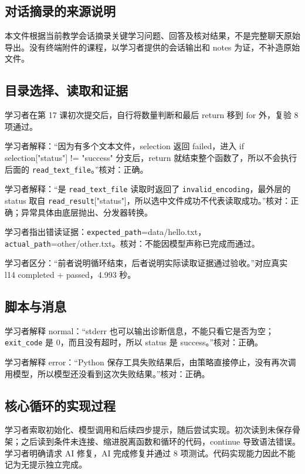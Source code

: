 \documentclass[UTF8,zihao=-4,fontset=fandol]{ctexart}
\begin{document}
\subsection{对话摘录的来源说明}

本文件根据当前教学会话摘录关键学习问题、回答及核对结果，不是完整聊天原始导出。没有终端附件的课程，以学习者提供的会话输出和 notes 为证，不补造原始文件。

\subsection{目录选择、读取和证据}

学习者在第 17 课初次提交后，自行将数量判断和最后 return 移到 for 外，复验 8 项通过。

学习者解释：“因为有多个文本文件，selection 返回 failed，进入 if selection["status"] != "success" 分支后，return 就结束整个函数了，所以不会执行后面的 \nolinkurl{read_text_file}。”核对：正确。

学习者解释：“是 \nolinkurl{read_text_file} 读取时返回了 \nolinkurl{invalid_encoding}，最外层的 status 取自 \nolinkurl{read_result}["status"]，所以选中文件成功不代表读取成功。”核对：正确；异常具体由底层抛出、分发器转换。

学习者指出错读证据：\nolinkurl{expected_path}=data/hello.txt，\nolinkurl{actual_path}=other/other.txt。核对：不能因模型声称已完成而通过。

学习者区分：“前者说明循环结束，后者说明实际读取证据通过验收。”对应真实 l14 completed + passed，4.993 秒。

\subsection{脚本与消息}

学习者解释 normal：“stderr 也可以输出诊断信息，不能只看它是否为空；\nolinkurl{exit_code} 是 0，而且没有超时，所以 status 是 success。”核对：正确。

学习者解释 error：“Python 保存工具失败结果后，由策略直接停止，没有再次调用模型，所以模型还没看到这次失败结果。”核对：正确。

\subsection{核心循环的实现过程}

学习者索取初始化、模型调用和后续四步提示，随后尝试实现。初次读到未保存骨架；之后读到条件未连接、缩进脱离函数和循环的代码，continue 导致语法错误。学习者明确请求 AI 修复，AI 完成修复并通过 8 项测试。代码实现能力因此不能记为无提示独立完成。
\end{document}
